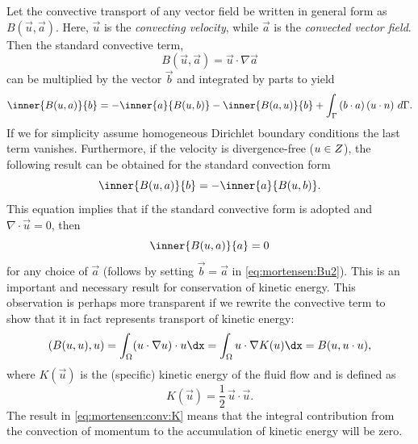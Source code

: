 Let the convective transport of any vector field be written in general form as
$B(\vec{u},\vec{a})$. Here, $\vec{u}$ is the \emph{convecting velocity},
while $\vec{a}$ is the \emph{convected vector field}. Then the standard
convective term,
\begin{equation}
B(\vec{u},\vec{a}) =  \vec{u} \cdot \nabla \vec{a}
\end{equation}
can be multiplied by the vector $\vec{b}$ and integrated by parts to yield
\begin{equation}
 \inner{ B(\vec{u}, \vec{a})}{\vec{b}}
      = -\inner{\vec{a}}{B(\vec{u},\vec{b})}
        - \inner{B (\vec{a}, \vec{u})}{\vec{b} }
        + \int_{\Gamma} \left(\vec{b} \cdot \vec{a} \right)\left(\vec{u} \cdot \vec{n} \right) \, d\Gamma.
\label{eq:mortensen:Bu1}
\end{equation}
If we for simplicity assume homogeneous Dirichlet boundary conditions
the last term vanishes. Furthermore, if the velocity is divergence-free
(${u}\in Z$), the following result can be obtained for the
standard convection form
\begin{equation}
  \inner{ B(\vec{u},\vec{a})}{\vec{b} } = -\inner{ \vec{a}}{ B(\vec{u},\vec{b}) }.
\label{eq:mortensen:Bu2}
\end{equation}
This equation implies that if the standard convective form is adopted
and $\nabla\cdot\vec{u} = 0$, then
\begin{equation}
\inner{ B(\vec{u}, \vec{a})}{ \vec{a} } = 0
\label{eq:mortensen:B0}
\end{equation}
for any choice of $\vec{a}$ (follows by setting $\vec{b}=\vec{a}$ in
\eqref{eq:mortensen:Bu2}). This is an important and necessary result
for conservation of kinetic energy. This observation is perhaps more
transparent if we rewrite the convective term to show that it in fact
represents transport of kinetic energy:
\begin{equation}
\label{eq:mortensen:conv:K}
\left(B(\vec{u}, \vec{u}), \vec{u} \right)
= \int_\Omega (\vec{u} \cdot \nabla \vec{u})\cdot\vec{u}\dx
= \int_\Omega \vec{u}\cdot\nabla K(\vec{u})\dx
= B(\vec{u}, \vec{u}\cdot\vec{u}),
\end{equation}
where $K(\vec{u})$ is the (specific) kinetic energy of the fluid flow
and is defined as
\begin{equation}
 K(\vec{u})=\frac{1}{2}\, \vec{u}\cdot \vec{u}. \label{eq:mortensen:K}
\end{equation}
The result in \eqref{eq:mortensen:conv:K} means that the integral
contribution from the convection of momentum to the accumulation of
kinetic energy will be zero.

